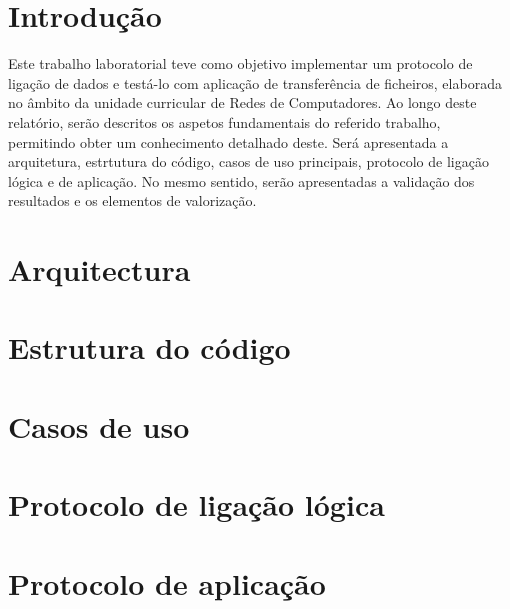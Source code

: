 \documentclass[a4paper]{article}
\begin{document}
\newpage

\section{Introdução}
Este trabalho laboratorial teve como objetivo implementar um protocolo de ligação de dados e testá-lo com aplicação de transferência de ficheiros, elaborada no âmbito da unidade curricular de Redes de Computadores.
Ao longo deste relatório, serão descritos os aspetos fundamentais do referido trabalho, permitindo obter um conhecimento detalhado deste. Será apresentada a arquitetura, estrtutura do código, casos de uso principais, protocolo de ligação lógica e de aplicação. No mesmo sentido, serão apresentadas a validação dos resultados e os elementos de valorização.

\section{Arquitectura}

\section{Estrutura do código}

\section{Casos de uso}

\section{Protocolo de ligação lógica}

\section{Protocolo de aplicação}
\end{document}
